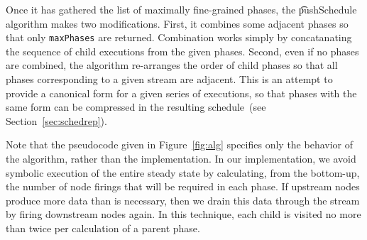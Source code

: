 Once it has gathered the list of maximally fine-grained phases, the
{\t pushSchedule} algorithm makes two modifications.  First, it
combines some adjacent phases so that only {\tt maxPhases} are
returned.  Combination works simply by concatanating the sequence of
child executions from the given phases.  Second, even if no phases are
combined, the algorithm re-arranges the order of child phases so that
all phases corresponding to a given stream are adjacent.  This is an
attempt to provide a canonical form for a given series of executions,
so that phases with the same form can be compressed in the resulting
schedule~(see Section~\ref{sec:schedrep}).

Note that the pseudocode given in Figure~\ref{fig:alg} specifies only
the behavior of the algorithm, rather than the implementation.  In our
implementation, we avoid symbolic execution of the entire steady state
by calculating, from the bottom-up, the number of node firings that
will be required in each phase.  If upstream nodes produce more data
than is necessary, then we drain this data through the stream by
firing downstream nodes again.  In this technique, each child is
visited no more than twice per calculation of a parent phase.

